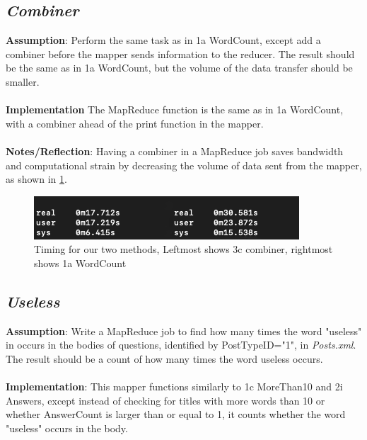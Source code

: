 \documentclass[fleqn,10pt]{wlscirep}
\begin{document}
\subsection{\emph{Combiner}}
\textbf{Assumption}: Perform the same task as in 1a WordCount, except add a combiner before the mapper sends information to the reducer. The result should be the same as in 1a WordCount, but the volume of the data transfer should be smaller. \\ \\
\textbf{Implementation} The MapReduce function is the same as in 1a WordCount, with a combiner ahead of the print function in the mapper. \\ \\
\textbf{Notes/Reflection}: Having a combiner in a MapReduce job saves bandwidth and computational strain by decreasing the volume of data sent from the mapper, as shown in \ref{fig:figure_label}.


\begin{figure}[H]
\centering
\includegraphics[width=1\linewidth]{images/time.png}
\caption{Timing for our two methods, Leftmost shows 3c combiner, rightmost shows 1a WordCount}
\label{fig:figure_label}
\end{figure}

\subsection{\emph{Useless}}
\textbf{Assumption}: Write a MapReduce job to find how many times the word "useless" in occurs in the bodies of questions, identified by PostTypeID="1", in \textit{Posts.xml}. The result should be a count of how many times the word useless occurs. \\ \\
\textbf{Implementation}: This mapper functions similarly to 1c MoreThan10 and 2i Answers, except instead of checking for titles with more words than 10 or whether AnswerCount is larger than or equal to 1, it counts whether the word "useless" occurs in the body. \\ \\

\end{document}
